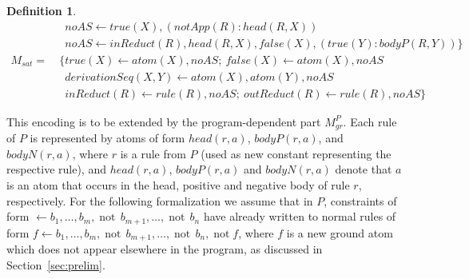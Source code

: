 \documentclass[11pt,fleqn,twoside]{article}
\def\naf{\ensuremath{\mathop{not}}}
\newcommand{\Program}{\ensuremath{P}}
\newtheorem{definition}{Definition}
\begin{document}
\begin{definition}
\begin{align}
						& \phantom{\ \{} \mathit{noAS} \leftarrow \mathit{true}(X), (\mathit{notApp}(R) : \mathit{head}(R,X))  \label{def:grewriting:10} \\
						& \phantom{\ \{} \mathit{noAS} \leftarrow \mathit{inReduct}(R), \mathit{head}(R,X), \mathit{false}(X), (\mathit{true}(Y) : \mathit{bodyP}(R,Y)) \}  \label{def:grewriting:11} \\[0.9ex]
					M_{\mathit{sat}} =& \ \{ \mathit{true}(X) \leftarrow \mathit{atom}(X), \mathit{noAS}; \ \mathit{false}(X) \leftarrow \mathit{atom}(X), \mathit{noAS}  \label{def:grewriting:12} \\
						& \phantom{\ \{} \mathit{derivationSeq}(X, Y) \leftarrow \mathit{atom}(X), \mathit{atom}(Y), \mathit{noAS} \label{def:grewriting:13} \\
						& \phantom{\ \{} \mathit{inReduct}(R) \leftarrow \mathit{rule}(R), \mathit{noAS}; \ \mathit{outReduct}(R) \leftarrow \mathit{rule}(R), \mathit{noAS} \} \label{def:grewriting:14}
				\end{align}
			\end{definition}

			This encoding is to be extended by the program-dependent part $M^P_{\mathit{gr}}$.
			Each rule of $\Program$ is represented by atoms of form
			$\mathit{head}(\mathit{r},a)$, $\mathit{bodyP}(\mathit{r},a)$, and $\mathit{bodyN}(\mathit{r},a)$,
			where $\mathit{r}$ is a rule from $\Program$ (used as new constant representing the respective rule),
			and $\mathit{head}(\mathit{r},a)$, $\mathit{bodyP}(\mathit{r},a)$ and $\mathit{bodyN}(\mathit{r},a)$
			denote that $a$ is an atom that occurs in the head, positive and negative body of rule $\mathit{r}$, respectively.
			For the following formalization we assume that in $P$,
			constraints of form
			$\leftarrow b_1,\dotsc, b_m, \naf\, b_{m+1}, \dotsc, \naf\, b_n$
			have already written to normal rules of form
			$f \leftarrow b_1,\dotsc, b_m, \naf\, b_{m+1}, \dotsc, \naf\, b_n, \naf f$,
			where $f$ is a new ground atom which does not appear elsewhere in the program,
			as discussed in Section~\ref{sec:prelim}.
			
\end{document}
